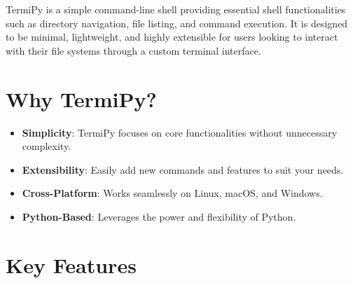\documentclass[
  letterpaper,
  DIV=11,
  numbers=noendperiod]{scrreprt}
\providecommand{\tightlist}{%
  \setlength{\itemsep}{0pt}\setlength{\parskip}{0pt}}\usepackage{longtable,booktabs,array}
\begin{document}

TermiPy is a simple command-line shell providing essential shell
functionalities such as directory navigation, file listing, and command
execution. It is designed to be minimal, lightweight, and highly
extensible for users looking to interact with their file systems through
a custom terminal interface.

\section*{Why TermiPy?}\label{why-termipy}


\begin{itemize}
\tightlist
\item
  \textbf{Simplicity}: TermiPy focuses on core functionalities without
  unnecessary complexity.
\item
  \textbf{Extensibility}: Easily add new commands and features to suit
  your needs.
\item
  \textbf{Cross-Platform}: Works seamlessly on Linux, macOS, and
  Windows.
\item
  \textbf{Python-Based}: Leverages the power and flexibility of Python.
\end{itemize}

\section*{Key Features}\label{key-features-1}

\end{document}
